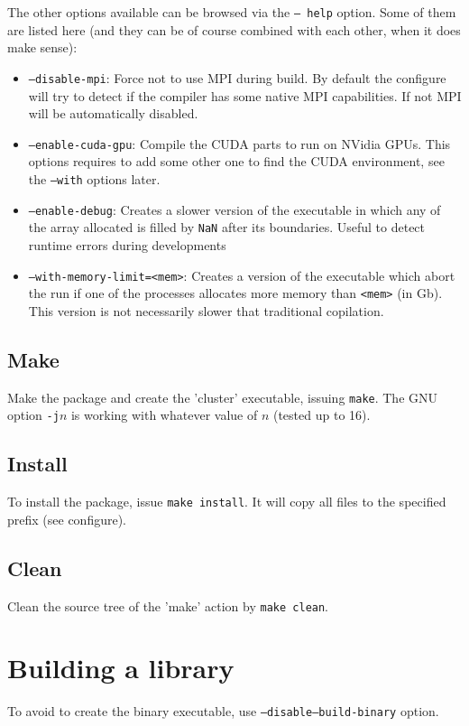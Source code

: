 \documentclass[a4paper,11pt]{report}
\begin{document}
The other options available can be browsed via the \texttt{-- help} option.
Some of them are listed here (and they can be of course combined with each other, when it does make sense):
\begin{itemize}
  \item \texttt{--disable-mpi}: Force not to use MPI during build. By default the configure will try to detect if the compiler has some native MPI capabilities. If not MPI will be automatically disabled.
  \item \texttt{--enable-cuda-gpu}: Compile the CUDA parts to run on NVidia GPUs. This options requires to add some other one to find the CUDA environment, see the \texttt{--with} options later.
\item \texttt{--enable-debug}: Creates a slower version of the executable in which any of the array allocated is filled by \texttt{NaN} after its boundaries. Useful to detect runtime errors during developments
\item \texttt{--with-memory-limit=<mem>}: Creates a version of the executable which abort the run if one of the processes allocates more memory than \texttt{<mem>} (in Gb). This version is not necessarily slower that traditional copilation.
\end{itemize}


\subsection{Make}
Make the package and create the 'cluster' executable, issuing \texttt{make}. The GNU option \texttt{-j$n$} is working with whatever value of $n$ (tested up to 16).

\subsection{Install}
To install the package, issue \texttt{make install}. It will copy all files to the specified prefix (see configure).

\subsection{Clean}
Clean the source tree of the 'make' action by \texttt{make clean}.

\section{Building a library}
To avoid to create the binary executable,
use \texttt{--disable--build-binary} option.
\end{document}
